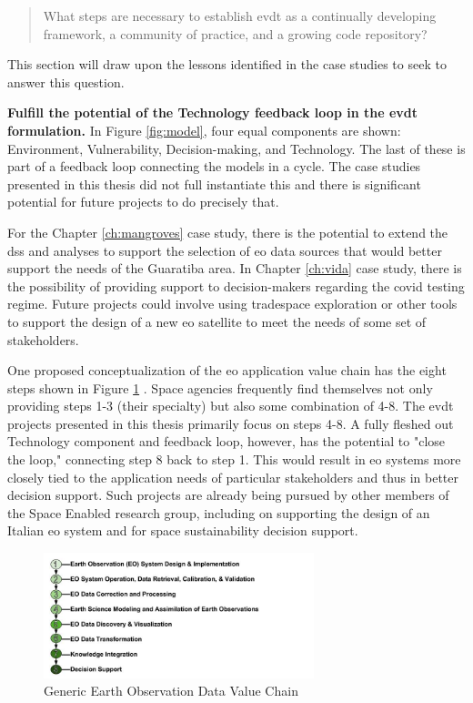 \blockquote{What steps are necessary to establish \ac{evdt} as a continually developing framework, a community of practice, and a growing code repository?}

This section will draw upon the lessons identified in the case studies to seek to answer this question. 

\textbf{Fulfill the potential of the Technology feedback loop in the \ac{evdt} formulation.} In Figure \ref{fig:model}, four equal components are shown: Environment, Vulnerability, Decision-making, and Technology. The last of these is part of a feedback loop connecting the models in a cycle. The case studies presented in this thesis did not full instantiate this and there is significant potential for future projects to do precisely that. 

For the Chapter \ref{ch:mangroves} case study, there is the potential to extend the \ac{dss} and analyses to support the selection of \ac{eo} data sources that would better support the needs of the Guaratiba area. In Chapter \ref{ch:vida} case study, there is the possibility of providing support to decision-makers regarding the \ac{covid} testing regime. Future projects could involve using tradespace exploration or other tools to support the design of a new \ac{eo} satellite to meet the needs of some set of stakeholders.  

One proposed conceptualization of the \ac{eo} application value chain has the eight steps shown in Figure \ref{fig:eochain}  \cite{hakimdavarTransboundaryWaterImproving2018, woodPartnershipsEnableEarth2017}. Space agencies frequently find themselves not only providing steps 1-3 (their specialty) but also some combination of 4-8. The \ac{evdt} projects presented in this thesis primarily focus on steps 4-8. A fully fleshed out Technology component and feedback loop, however, has the potential to "close the loop," connecting step 8 back to step 1. This would result in \ac{eo} systems more closely tied to the application needs of particular stakeholders and thus in better decision support. Such projects are already being pursued by other members of the Space Enabled research group, including on supporting the design of an Italian \ac{eo} system and for space sustainability decision support.

\begin{figure}[ht]
    \centering
    \includegraphics[width=0.7\textwidth]{Figures/chap7/EOChain.jpg}
    \caption{Generic Earth Observation Data Value Chain}
    \label{fig:eochain}
\end{figure}

